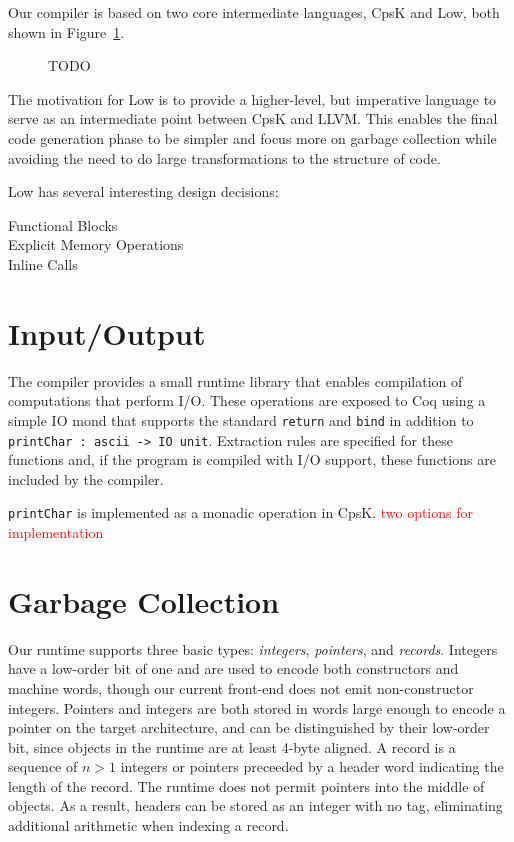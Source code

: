 \documentclass{article}
\newcommand{\todo}[1]{\textcolor{red}{#1}}
\begin{document}
Our compiler is based on two core intermediate languages, CpsK and Low, both shown in Figure~\ref{fig:cpsk-low}.
\begin{figure}

TODO

\caption{}
\label{fig:cpsk-low}
\end{figure}

The motivation for Low is to provide a higher-level, but imperative language to serve as an intermediate point between CpsK and LLVM. This enables the final code generation phase to be simpler and focus more on garbage collection while avoiding the need to do large transformations to the structure of code.

Low has several interesting design decisions:
\begin{description}
\item[Functional Blocks]
\item[Explicit Memory Operations]
\item[Inline Calls]
\end{description}

\section{Input/Output}
\label{sec:io}

The compiler provides a small runtime library that enables compilation of computations that perform I/O. These operations are exposed to Coq using a simple IO mond that supports the standard \lstinline!return! and \lstinline!bind! in addition to \lstinline!printChar : ascii -> IO unit!. Extraction rules are specified for these functions and, if the program is compiled with I/O support, these functions are included by the compiler.

\lstinline!printChar! is implemented as a monadic operation in CpsK. \todo{two options for implementation}


\section{Garbage Collection}
\label{sec:gc}

Our runtime supports three basic types: \emph{integers}, \emph{pointers}, and \emph{records}. Integers have a low-order bit of one and are used to encode both constructors and machine words, though our current front-end does not emit non-constructor integers. Pointers and integers are both stored in words large enough to encode a pointer on the target architecture, and can be distinguished by their low-order bit, since objects in the runtime are at least 4-byte aligned. A record is a sequence of $n > 1$ integers or pointers preceeded by a header word indicating the length of the record. The runtime does not permit pointers into the middle of objects. As a result, headers can be stored as an integer with no tag, eliminating additional arithmetic when indexing a record.
\end{document}
